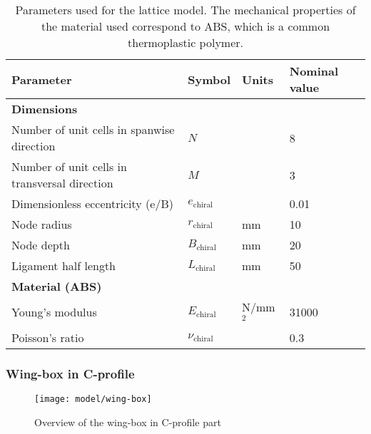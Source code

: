 \begin{table}[!htpb]
\centering
\begin{tabular}{|l|lll|}
\hline
\textbf{Parameter} & \multicolumn{1}{l|}{\textbf{Symbol}} & \multicolumn{1}{l|}{\textbf{Units}} & \textbf{Nominal value} \\ \hline \hline
{\textbf{Dimensions}} &  &  &  \\ \hline
Number of unit cells in spanwise direction & \multicolumn{1}{l|}{$N$} & \multicolumn{1}{l|}{} & 8 \\ \hline
Number of unit cells in transversal direction & \multicolumn{1}{l|}{$M$} & \multicolumn{1}{l|}{} & 3 \\ \hline
Dimensionless eccentricity (e/B) & \multicolumn{1}{l|}{$e_{\mathrm{chiral}}$} & \multicolumn{1}{l|}{} & 0.01 \\ \hline
Node radius & \multicolumn{1}{l|}{$r_{\mathrm{chiral}}$} & \multicolumn{1}{l|}{mm} & 10 \\ \hline
Node depth & \multicolumn{1}{l|}{$B_{\mathrm{chiral}}$} & \multicolumn{1}{l|}{mm} & 20 \\ \hline
Ligament half length & \multicolumn{1}{l|}{$L_{\mathrm{chiral}}$} & \multicolumn{1}{l|}{mm} & 50 \\ \hline \hline
{\textbf{Material (ABS)}} &  &  &  \\ \hline
Young's modulus & \multicolumn{1}{l|}{$E_{\mathrm{chiral}}$} & \multicolumn{1}{l|}{N/mm$^2$} & 31000 \\ \hline
Poisson's ratio & \multicolumn{1}{l|}{$\nu_{\mathrm{chiral}}$} & \multicolumn{1}{l|}{} & 0.3 \\ \hline
\end{tabular}
\caption[Parameters used for the lattice model]{Parameters used for the lattice model. The mechanical properties of the material used correspond to ABS, which is a common thermoplastic polymer.}
\label{tab:parameters_lattice}
\end{table}

\subsubsection{Wing-box in C-profile} \label{subsubsec:wingBox_Parametrization}

\begin{figure}[!htpb]
  \centering
  \texttt{[image: model/wing-box]}
  \caption[Overview of the wing-box in C-profile part]{Overview of the wing-box in C-profile part}\label{fig:wing-box}
\end{figure}

